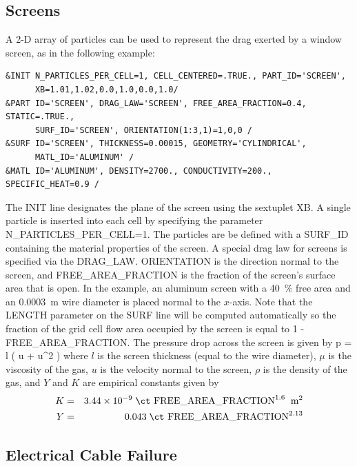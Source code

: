 \documentclass[11pt]{book}
\begin{document}
\subsection{Screens}
\label{info:particle_screen}

A 2-D array of particles can be used to represent the drag exerted by a window screen, as in the following example:
\begin{lstlisting}
&INIT N_PARTICLES_PER_CELL=1, CELL_CENTERED=.TRUE., PART_ID='SCREEN',
      XB=1.01,1.02,0.0,1.0,0.0,1.0/
&PART ID='SCREEN', DRAG_LAW='SCREEN', FREE_AREA_FRACTION=0.4, STATIC=.TRUE.,
      SURF_ID='SCREEN', ORIENTATION(1:3,1)=1,0,0 /
&SURF ID='SCREEN', THICKNESS=0.00015, GEOMETRY='CYLINDRICAL',
      MATL_ID='ALUMINUM' /
&MATL ID='ALUMINUM', DENSITY=2700., CONDUCTIVITY=200., SPECIFIC_HEAT=0.9 /
\end{lstlisting}
The {\ct INIT} line designates the plane of the screen using the sextuplet {\ct XB}. A single particle is inserted into each cell by specifying the parameter {\ct N\_PARTICLES\_PER\_CELL=1}.  The particles are be defined with a {\ct SURF\_ID} containing the material properties of the screen.  A special drag law for screens is specified via the {\ct DRAG\_LAW}.  {\ct ORIENTATION} is the direction normal to the screen, and {\ct FREE\_AREA\_FRACTION} is the fraction of the screen's surface area that is open. In the example, an aluminum screen with a 40~\% free area and an 0.0003~m wire diameter is placed normal to the $x$-axis.  Note that the {\ct LENGTH} parameter on the {\ct SURF} line will be computed automatically so the fraction of the grid cell flow area occupied by the screen is equal to 1 - {\ct FREE\_AREA\_FRACTION}. The pressure drop across the screen is given by
\be
   \Delta p =  l \; \left( u + \rho {} u^2 \right)
\ee
where $l$ is the screen thickness (equal to the wire diameter), $\mu$ is the viscosity of the gas, $u$ is the velocity normal to the screen, $\rho$ is the density of the gas, and $Y$ and $K$ are empirical constants given by
\begin{eqnarray}
   K &=& 3.44 \times 10^{-9} \; \hbox{\ct FREE\_AREA\_FRACTION}^{1.6} \; \; \hbox{m}^2 \\
   Y &=& 0.043 \; \hbox{\ct FREE\_AREA\_FRACTION}^{2.13}
\end{eqnarray}


\subsection{Electrical Cable Failure}
\label{info:THIEF}
\end{document}
